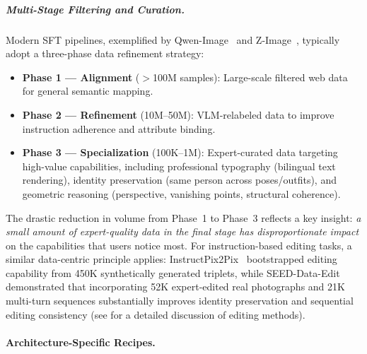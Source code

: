 \documentclass{llmxive}
\begin{document}
\subparagraph{Multi-Stage Filtering and Curation.}
Modern SFT pipelines, exemplified by Qwen-Image~\citep{wu2025qwen} and Z-Image~\citep{cai2025z}, typically adopt a three-phase data refinement strategy:
\begin{itemize}[leftmargin=*,itemsep=2pt]
    \item \textbf{Phase 1 --- Alignment} ($>$100M samples): Large-scale filtered web data for general semantic mapping.
    \item \textbf{Phase 2 --- Refinement} (10M--50M): VLM-relabeled data to improve instruction adherence and attribute binding.
    \item \textbf{Phase 3 --- Specialization} (100K--1M): Expert-curated data targeting high-value capabilities, including professional typography (bilingual text rendering), identity preservation (same person across poses/outfits), and geometric reasoning (perspective, vanishing points, structural coherence).
\end{itemize}
The drastic reduction in volume from Phase~1 to Phase~3 reflects a key insight: \emph{a small amount of expert-quality data in the final stage has disproportionate impact} on the capabilities that users notice most. For instruction-based editing tasks, a similar data-centric principle applies: InstructPix2Pix~\citep{brooks2023instructpix2pix} bootstrapped editing capability from 450K synthetically generated triplets, while SEED-Data-Edit~\citep{ge2024seed} demonstrated that incorporating 52K expert-edited real photographs and 21K multi-turn sequences substantially improves identity preservation and sequential editing consistency (see  for a detailed discussion of editing methods).

\paragraph{Architecture-Specific Recipes.}
\end{document}
